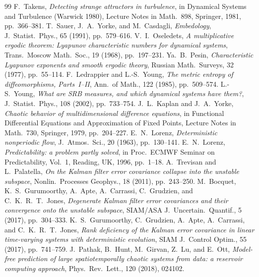 \documentclass[10pt]{article}
\theoremstyle{plain}
\theoremstyle{definition}
\theoremstyle{remark}
\begin{document}
\begin{thebibliography}{99}
 F.~Takens, \emph{Detecting strange attractors in
  turbulence}, in Dynamical Systems and Turbulence (Warwick 1980), Lecture Notes
  in Math.\ 898, Springer, 1981, pp.~366--381.
 T.~Sauer, J.~A.~Yorke, and M.~Casdagli, \emph{Embedology},
  J.~Statist.~Phys., 65 (1991), pp.~579--616.
 V.~I.~Oseledets, \emph{A multiplicative ergodic theorem:
  Lyapunov characteristic numbers for dynamical systems}, Trans.~Moscow
  Math.~Soc., 19 (1968), pp.~197--231.
 Ya.~B.~Pesin, \emph{Characteristic Lyapunov exponents and
  smooth ergodic theory}, Russian Math.~Surveys, 32 (1977), pp.~55--114.
 F.~Ledrappier and L.-S.~Young, \emph{The metric
  entropy of diffeomorphisms, Parts~I--II}, Ann.\ of Math., 122 (1985),
  pp.~509--574.
 L.-S.~Young, \emph{What are SRB measures, and which dynamical
  systems have them?}, J.~Statist.~Phys., 108 (2002), pp.~733--754.
 J.~L.~Kaplan and J.~A.~Yorke, \emph{Chaotic behavior
  of multidimensional difference equations}, in Functional Differential Equations
  and Approximation of Fixed Points, Lecture Notes in Math.\ 730, Springer, 1979,
  pp.~204--227.
 E.~N.~Lorenz, \emph{Deterministic nonperiodic flow},
  J.~Atmos.~Sci., 20 (1963), pp.~130--141.
 E.~N.~Lorenz, \emph{Predictability: a problem partly
  solved}, in Proc.~ECMWF Seminar on Predictability, Vol.~1, Reading, UK, 1996,
  pp.~1--18.
 A.~Trevisan and L.~Palatella, \emph{On the Kalman filter
  error covariance collapse into the unstable subspace}, Nonlin.~Processes
  Geophys., 18 (2011), pp.~243--250.
 M.~Bocquet, K.~S.~Gurumoorthy, A.~Apte, A.~Carrassi,
  C.~Grudzien, and C.~K.~R.~T.~Jones, \emph{Degenerate Kalman filter error
  covariances and their convergence onto the unstable subspace}, SIAM/ASA
  J.~Uncertain.~Quantif., 5 (2017), pp.~304--333.
 K.~S.~Gurumoorthy, C.~Grudzien, A.~Apte, A.~Carrassi,
  and C.~K.~R.~T.~Jones, \emph{Rank deficiency of the Kalman error covariance in
  linear time-varying systems with deterministic evolution}, SIAM J.~Control
  Optim., 55 (2017), pp.~741--759.
 J.~Pathak, B.~Hunt, M.~Girvan, Z.~Lu, and E.~Ott,
  \emph{Model-free prediction of large spatiotemporally chaotic systems from
  data: a reservoir computing approach}, Phys.~Rev.~Lett., 120 (2018), 024102.
\end{thebibliography}
\end{document}
